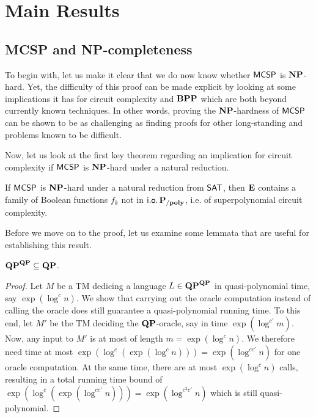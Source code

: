 \documentclass[11pt]{article}
\begin{document}


\section{Main Results}

\subsection{MCSP and NP-completeness}
\label{subsect:MCSP-NP}

To begin with, let us make it clear that we do now know whether
$\mathsf{MCSP}$ is $\mathbf{NP}$-hard.
Yet, the difficulty of this proof can be made explicit by looking at
some implications it has for circuit complexity and $\mathbf{BPP}$ which are both
beyond currently known techniques.
%
In other words, proving the $\mathbf{NP}$-hardness of $\mathsf{MCSP}$ can be shown
to be as challenging as finding proofs for other long-standing and
problems known to be difficult.

Now, let us look at the first key theorem regarding an
implication for circuit complexity if $\mathsf{MCSP}$ is $\mathbf{NP}$-hard
under a natural reduction.

\begin{theorem}[\cite{10.1145/335305.335314}]
  \label{thm:15-1}
  If $\mathsf{MCSP}$ is $\mathbf{NP}$-hard under a natural reduction from
  $\mathsf{SAT}$, then $\mathbf{E}$ contains a family of Boolean functions
  $f_k$ not in $\mathsf{i.o.}\, \mathbf{P_{/poly}}$, i.e. of superpolynomial circuit complexity.
\end{theorem}

Before we move on to the proof, let us examine some lemmata that are useful
for establishing this result.

\begin{lemma}
	\label{lem:qp-collapse}
	$\mathbf{QP}^{\mathbf{QP}} \subseteq \mathbf{QP}$.
\end{lemma}

\begin{proof}
  Let $M$ be a TM dedicing a language $L \in \mathbf{QP}^{\mathbf{QP}}$ in
  quasi-polynomial time, say $\exp(\log^c n)$.
  We show that carrying out the oracle computation instead of calling the
  oracle does still guarantee a quasi-polynomial running time. To this end,
  let $M'$ be the TM deciding the $\mathbf{QP}$-oracle, say in time
  $\exp(\log^{c'} m)$.
  Now, any input to $M'$ is at most of length $m = \exp(\log^c n)$. We
  therefore need time at most
  $\exp(\log^c (\exp(\log^c n))) = \exp(\log^{cc'} n)$
  for one oracle computation. At the same time, there are at most
  $\exp(\log^c n)$ calls, resulting in a total running time bound of
  $\exp(\log^c (\exp(\log^{cc'} n))) = \exp(\log^{c^2 c'} n)$
  which is still quasi-polynomial.
\end{proof}
\end{document}
